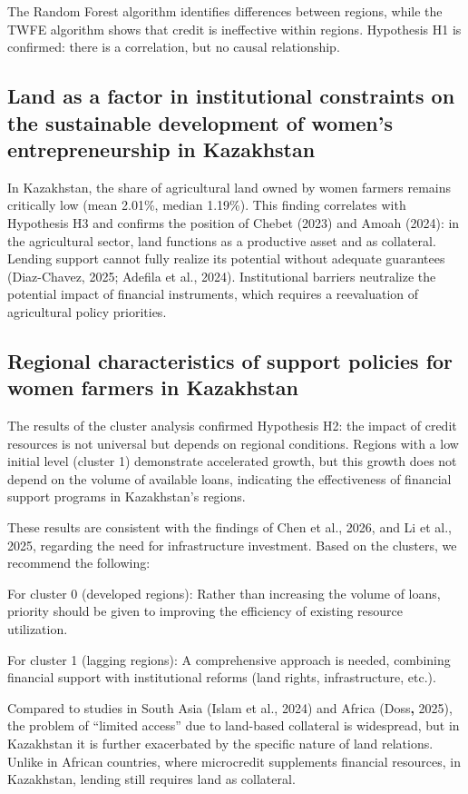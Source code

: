 ﻿\documentclass[sn-mathphys-num]{sn-jnl}
\newcommand{\hl}[1]{#1}
\begin{document}
The Random Forest algorithm identifies differences between regions,
while the TWFE algorithm shows that credit is ineffective within
regions. Hypothesis H1 is confirmed: there is a correlation, but no
causal relationship.

\subsection{Land as a factor in institutional constraints on the sustainable development of women's entrepreneurship in Kazakhstan}

In Kazakhstan, the share of agricultural land owned by women farmers
remains critically low (mean 2.01\%, median 1.19\%). This finding
correlates with Hypothesis H3 and confirms the position \hl{of Chebet
(2023)} and \hl{Amoah} (2024): in the agricultural sector, land
functions as a productive asset and as collateral. Lending support
cannot fully realize its potential without adequate guarantees
(\hl{Diaz-Chavez, 2025; Adefila et al., 2024}). Institutional barriers
neutralize the potential impact of financial instruments, which requires
a reevaluation of agricultural policy priorities.

\subsection{Regional characteristics of support policies for women farmers in Kazakhstan}

The results of the cluster analysis confirmed Hypothesis H2: the impact
of credit resources is not universal but depends on regional conditions.
Regions with a low initial level (cluster 1) demonstrate accelerated
growth, but this growth does not depend on the volume of available
loans, indicating the effectiveness of financial support programs in
Kazakhstan's regions.

These results are consistent with the findings \hl{of Chen et al.,
2026,} and \hl{Li et al., 2025,} regarding the need for infrastructure
investment. Based on the clusters, we recommend the following:

For cluster 0 (developed regions): Rather than increasing the volume of
loans, priority should be given to improving the efficiency of existing
resource utilization.

For cluster 1 (lagging regions): A comprehensive approach is needed,
combining financial support with institutional reforms (land rights,
infrastructure, etc.).

Compared to studies in South Asia (\hl{Islam et al., 2024)} and Africa
(\hl{Doss}\textbf{,} \hl{2025}), the problem of ``limited access'' due
to land-based collateral is widespread, but in Kazakhstan it is further
exacerbated by the specific nature of land relations. Unlike in African
countries, where microcredit supplements financial resources, in
Kazakhstan, lending still requires land as collateral.
\end{document}

